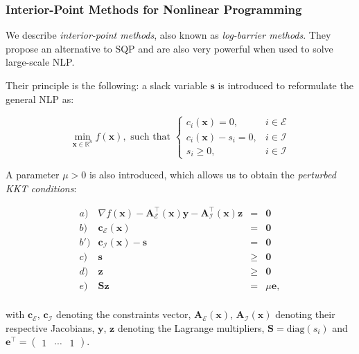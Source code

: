 \subsubsection{Interior-Point Methods for Nonlinear Programming}

We describe \emph{interior-point methods}, also known as
\emph{log-barrier methods}. They propose an alternative to SQP and are
also very powerful when used to solve large-scale NLP.

Their principle is the following: a slack variable $\mathbf{s}$ is
introduced to reformulate the general NLP as:

\begin{equation}
\label{eq:chap3-nlp-slack}
\min_{\mathbf{x} \in \mathbb R^n}
f(\mathbf{x}),\text{ such that }
\left\{\begin{array}{cc}
c_i(\mathbf{x}) = 0, & i \in \mathcal{E} \\%
c_i(\mathbf{x})-s_i = 0, & i \in \mathcal{I} \\%
s_i \ge 0, & i \in \mathcal{I} %
\end{array}\right.
\end{equation}

A parameter $\mu>0$ is also introduced, which allows us to obtain the
\emph{perturbed KKT conditions}:

\begin{equation}
\label{eq:chap3-kkt-perturbed}
\begin{array}{crcl}
a) & \nabla f(\mathbf{x}) - \mathbf{A}_\mathcal{E}^{\top}(\mathbf{x})\mathbf{y} - \mathbf{A}_\mathcal{I}^{\top}(\mathbf{x})\mathbf{z} & = & \mathbf{0} \\%
b) & \mathbf{c}_{\mathcal{E}}(\mathbf{x}) & = & \mathbf{0} \\%
b')& \mathbf{c}_{\mathcal{I}}(\mathbf{x}) - \mathbf{s}& = & \mathbf{0} \\%
c) & \mathbf{s} & \ge & \mathbf{0} \\%
d) & \mathbf{z} & \ge & \mathbf{0} \\%
e) & \mathbf{S}\mathbf{z} & = & \mu\mathbf{e}, \\%
\end{array}
\end{equation}

with $\mathbf{c}_{\mathcal{E}}$, $\mathbf{c}_{\mathcal{I}}$ denoting
the constraints vector, $\mathbf{A}_\mathcal{E}(\mathbf{x})$,
$\mathbf{A}_\mathcal{I}(\mathbf{x})$ denoting their respective
Jacobians, $\mathbf{y}$, $\mathbf{z}$ denoting the Lagrange
multipliers, $\mathbf{S}=\text{diag}(s_i)$ and
$\mathbf{e}^\top=\left(\begin{matrix}1&\cdots&1\end{matrix}\right)$.

